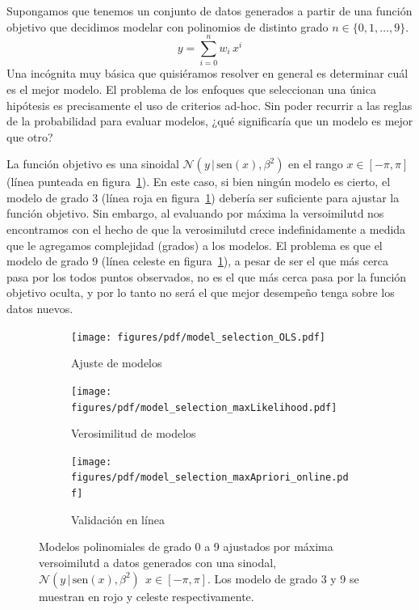 \documentclass[a4paper,11pt]{book}
\newcommand{\N}{\mathcal{N}}
\theoremstyle{definition}
\begin{document}

Supongamos que tenemos un conjunto de datos generados a partir de una función objetivo que decidimos modelar con polinomios de distinto grado $n \in \{0, 1, \dots, 9\}$.
%
\begin{equation*}
y = \sum_{i=0}^n w_i \, x^i
\end{equation*}
%
Una incógnita muy básica que quisiéramos resolver en general es determinar cuál es el mejor modelo.
%
El problema de los enfoques que seleccionan una única hipótesis es precisamente el uso de criterios ad-hoc.
%
Sin poder recurrir a las reglas de la probabilidad para evaluar modelos, ¿qué significaría que un modelo es mejor que otro?


La función objetivo es una sinoidal $\N(y \,| \, \text{sen}(x), \beta^2)$ en el rango $x \in [-\pi,\pi]$ (línea punteada en figura~\ref{fig:model_selection_OLS}).
%
En este caso, si bien ningún modelo es cierto, el modelo de grado 3 (línea roja en figura~\ref{fig:model_selection_OLS}) debería ser suficiente para ajustar la función objetivo.
%
Sin embargo, al evaluando por máxima la versoimilutd nos encontramos con el hecho de que la verosimilutd crece indefinidamente a medida que le agregamos complejidad (grados) a los modelos.
%
El problema es que el modelo de grado 9 (línea celeste en figura~\ref{fig:model_selection_OLS}), a pesar de ser el que más cerca pasa por los todos puntos observados, no es el que más cerca pasa por la función objetivo oculta, y por lo tanto no será el que mejor desempeño tenga sobre los datos nuevos.


\begin{figure}[ht!] \centering
  \begin{subfigure}[t]{0.32\textwidth}
  \centering
  \texttt{[image: figures/pdf/model\_selection\_OLS.pdf]}
  \caption{Ajuste de modelos}
  \label{fig:model_selection_OLS}
  \end{subfigure}
  \begin{subfigure}[t]{0.32\textwidth}
  \centering
  \texttt{[image: figures/pdf/model\_selection\_maxLikelihood.pdf]}
  \caption{Verosimilitud de modelos}
  \label{fig:model_selection_maxLikelihood}
  \end{subfigure}
  \begin{subfigure}[t]{0.32\textwidth}
  \centering
  \texttt{[image: figures/pdf/model\_selection\_maxApriori\_online.pdf]}
  \caption{Validación en línea}
  \label{fig:model_selection_maxApriori_online}
  \end{subfigure}
  \caption{Modelos polinomiales de grado 0 a 9 ajustados por máxima versoimilutd a datos generados con una sinodal, $\N(y \,| \, \text{sen}(x), \beta^2) \ \ x \in [-\pi,\pi]$. Los modelo de grado 3 y 9 se muestran en rojo y celeste respectivamente.}
  \label{fig:overfitting}
\end{figure}
\end{document}
